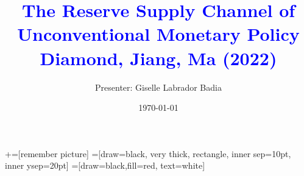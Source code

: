 \documentclass[notes,11pt, aspectratio=169]{beamer}
\title[]{\textcolor{blue}{The Reserve Supply Channel of Unconventional Monetary Policy \\ Diamond, Jiang, Ma (2022)}}
\author{ Presenter: Giselle Labrador Badia}
\date{\today}
\begin{document}
\newcommand\marktopleft[1]{%
    \tikz[overlay,remember picture] 
        \node (marker-#1-a) at (-.3em,.3em) {};%
}
\newcommand\markbottomright[2]{%
    \tikz[overlay,remember picture] 
        \node (marker-#1-b) at (0em,0em) {};%
}
+=[remember picture] 
 =[draw=black, very thick, rectangle, inner sep=10pt, inner ysep=20pt]
 =[draw=black,fill=red, text=white]

\begin{frame}
  \maketitle
\end{frame}




  
  
  
   
\end{document}
